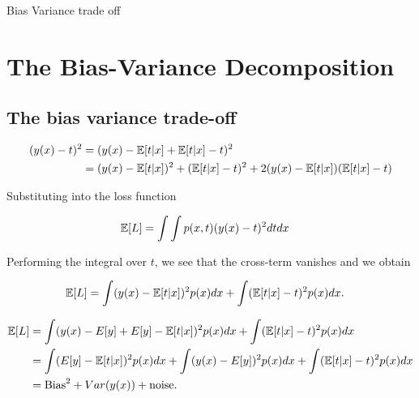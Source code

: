 \begin{frame}{Bias Variance trade off}
\section{The Bias-Variance Decomposition}
\subsection{The bias variance trade-off}

\begin{align}
    (y(x)-t)^2 
    &=  
    (y(x) -\mathbb{E}[t|x] + \mathbb{E}[t|x] -t)^2  
    \\
    &= 
    (y(x) -\mathbb{E}[t|x])^2 
    + 
    (\mathbb{E}[t|x] -t)^2 
    +
    2(y(x) -\mathbb{E}[t|x])(\mathbb{E}[t|x] -t)
\end{align}

Substituting into the loss function 

\begin{align}
    \mathbb{E}[L] &= 
    \int \int
    p(x,t) (y(x)-t)^2 
    dt dx
\end{align}

Performing the integral over $t$, we see that the cross-term
vanishes and we obtain 

\begin{align}
    \mathbb{E}[L]
    &=  
    \int 
    (y(x) -\mathbb{E}[t|x])^2 p(x) dx
    + 
    \int 
    (\mathbb{E}[t|x] -t)^2 p(x) dx.
\end{align}
\end{frame}

\begin{frame}
    \begin{align}
        \mathbb{E}[L]
        &=  
        \int 
        (y(x)- E[y] + E[y] -\mathbb{E}[t|x])^2 p(x) dx
        + 
        \int 
        (\mathbb{E}[t|x] -t)^2 p(x) dx
        \nonumber
        \\
        &=  
        \int 
        (E[y] -\mathbb{E}[t|x])^2 p(x) dx
        +
        \int 
        (y(x)- E[y])^2 p(x) dx
        + 
        \int 
        (\mathbb{E}[t|x] -t)^2 p(x) dx
        \nonumber
        \\
        &=
        \text{Bias}^2 + Var(y(x)) + \text{noise}.
    \end{align}
\end{frame}



